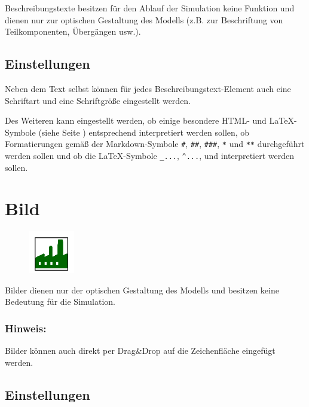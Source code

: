 Beschreibungstexte besitzen für den Ablauf der Simulation keine Funktion und dienen nur zur optischen Gestaltung des Modells
(z.B. zur Beschriftung von Teilkomponenten, Übergängen usw.).

\subsection*{Einstellungen}

Neben dem Text selbst können für jedes Beschreibungstext-Element auch eine Schriftart und eine Schriftgröße eingestellt werden.

Des Weiteren kann eingestellt werden, ob einige besondere HTML- und LaTeX-Symbole (siehe Seite \pageref{ref:TextEntities}) entsprechend
interpretiert werden sollen, ob Formatierungen gemäß der Markdown-Symbole \texttt{\#}, \texttt{\#\#}, \texttt{\#\#\#}, \texttt{*}
und \texttt{**} durchgeführt werden sollen und ob die LaTeX-Symbole \texttt{_{...}}, \texttt{^{...}},
\texttt{} und \texttt{} interpretiert werden sollen.


\section{Bild}
\label{ref:ModelElementImage}

\begin{figure}
\vspace{-22pt}
\includegraphics[width=2cm]{imageModelElementImage.png}
\vspace{-22pt}
\end{figure}

Bilder dienen nur der optischen Gestaltung des Modells und besitzen keine Bedeutung für die Simulation.

\subsubsection*{Hinweis:}

Bilder können auch direkt per Drag\&Drop auf die Zeichenfläche eingefügt werden.

\subsection*{Einstellungen}

